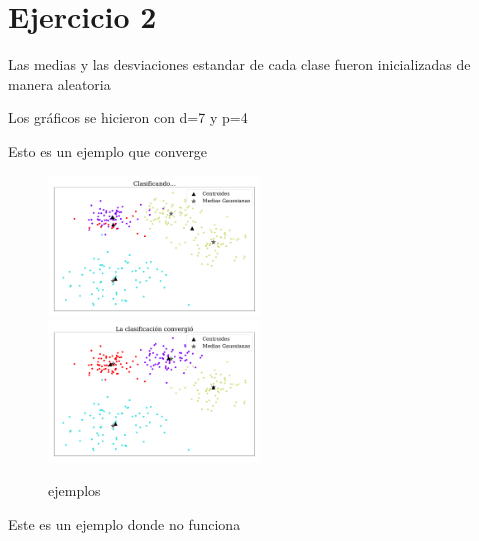 

    \section*{Ejercicio 2}

    Las medias y las desviaciones estandar de cada clase fueron inicializadas de manera aleatoria

    Los gráficos se hicieron con d=7 y p=4


    Esto es un ejemplo que converge
    \begin{figure}[H]
        \centering
        \includegraphics[width=0.5\textwidth]{plots/ejer_2_clasificando_a_conv.pdf}
        \includegraphics[width=0.5\textwidth]{plots/ejer_2_si_converge.pdf}
        \caption{ejemplos}
        \label{fig:ejer2_converge}
    \end{figure}

    Este es un ejemplo donde no funciona

